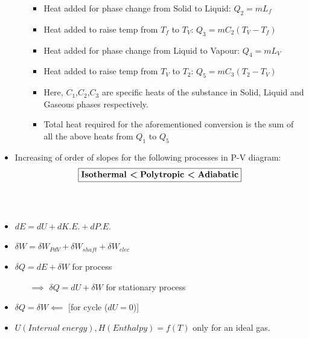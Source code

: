 \documentclass[8pt]{article}
\begin{document}
\begin{itemize}
\begin{itemize}[wide]
\begin{itemize}
				\item Heat added for phase change from Solid to Liquid: $\boxed{Q_2 = mL_f}$
				\item Heat added to raise temp from $T_f$ to $T_V$: $\boxed{Q_3 = mC_2(T_V-T_f)}$
				\item Heat added for phase change from Liquid to Vapour: $\boxed{Q_4 = mL_V}$
				\item Heat added to raise temp from $T_V$ to $T_2$: $\boxed{Q_5 = mC_3(T_2-T_V)}$
				\item Here, $C_1$,$C_2$,$C_3$ are specific heats of the substance in Solid, Liquid and Gaseous phases respectively.
				\item Total heat required for the aforementioned conversion is the sum of all the above heats from $Q_1$ to $Q_5$
			\end{itemize}
		\end{itemize}
	\item Increasing of order of slopes for the following processes in P-V diagram:$$\boxed{\textbf{Isothermal \textless \;Polytropic \textless \;Adiabatic}}$$
\end{itemize}
\hrulefill
\begin{center}
\subsection*{}
\end{center}
\\
	\begin{itemize}
		\item $dE = dU + dK.E. + dP.E.$
		\item $\delta W = \delta W_{PdV} + \delta W_{shaft} + \delta W_{elec} $
		\item $\delta Q = dE + \delta W$ for process
			\begin{itemize}
				\item[$\implies$] $\boxed{\delta Q = dU + \delta W}$ for stationary process
			\end{itemize}
		\item $\delta Q = \delta W \impliedby$ [for cycle ($dU = 0$)]
		\item $U(Internal\;energy),H(Enthalpy) = f(T)$ only for an ideal gas.	
	\end{itemize}\hrulefill\\\\
\end{document}
